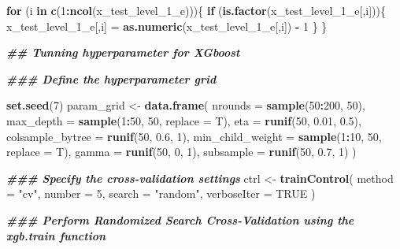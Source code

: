 \documentclass[11pt,]{article}
\newenvironment{Shaded}{\begin{snugshade}}{\end{snugshade}}
\newcommand{\AttributeTok}[1]{\textcolor[rgb]{0.13,0.29,0.53}{#1}}
\newcommand{\ConstantTok}[1]{\textcolor[rgb]{0.56,0.35,0.01}{#1}}
\newcommand{\ControlFlowTok}[1]{\textcolor[rgb]{0.13,0.29,0.53}{\textbf{#1}}}
\newcommand{\DecValTok}[1]{\textcolor[rgb]{0.00,0.00,0.81}{#1}}
\newcommand{\DocumentationTok}[1]{\textcolor[rgb]{0.56,0.35,0.01}{\textbf{\textit{#1}}}}
\newcommand{\FloatTok}[1]{\textcolor[rgb]{0.00,0.00,0.81}{#1}}
\newcommand{\FunctionTok}[1]{\textcolor[rgb]{0.13,0.29,0.53}{\textbf{#1}}}
\newcommand{\NormalTok}[1]{#1}
\newcommand{\OtherTok}[1]{\textcolor[rgb]{0.56,0.35,0.01}{#1}}
\newcommand{\SpecialCharTok}[1]{\textcolor[rgb]{0.81,0.36,0.00}{\textbf{#1}}}
\newcommand{\StringTok}[1]{\textcolor[rgb]{0.31,0.60,0.02}{#1}}
\begin{document}
\begin{Shaded}
\begin{Highlighting}[]
\ControlFlowTok{for}\NormalTok{ (i }\ControlFlowTok{in} \FunctionTok{c}\NormalTok{(}\DecValTok{1}\SpecialCharTok{:}\FunctionTok{ncol}\NormalTok{(x\_test\_level\_1\_e)))\{}
  \ControlFlowTok{if}\NormalTok{ (}\FunctionTok{is.factor}\NormalTok{(x\_test\_level\_1\_e[,i]))\{}
\NormalTok{    x\_test\_level\_1\_e[,i] }\OtherTok{=} \FunctionTok{as.numeric}\NormalTok{(x\_test\_level\_1\_e[,i]) }\SpecialCharTok{{-}} \DecValTok{1}
\NormalTok{  \}}
\NormalTok{\}}

\DocumentationTok{\#\# Tunning hyperparameter for XGboost}

\DocumentationTok{\#\#\# Define the hyperparameter grid}

\FunctionTok{set.seed}\NormalTok{(}\DecValTok{7}\NormalTok{)}
\NormalTok{param\_grid }\OtherTok{\textless{}{-}} \FunctionTok{data.frame}\NormalTok{(}
  \AttributeTok{nrounds =} \FunctionTok{sample}\NormalTok{(}\DecValTok{50}\SpecialCharTok{:}\DecValTok{200}\NormalTok{, }\DecValTok{50}\NormalTok{),                   }
  \AttributeTok{max\_depth =} \FunctionTok{sample}\NormalTok{(}\DecValTok{1}\SpecialCharTok{:}\DecValTok{50}\NormalTok{, }\DecValTok{50}\NormalTok{, }\AttributeTok{replace =}\NormalTok{ T),                    }
  \AttributeTok{eta =} \FunctionTok{runif}\NormalTok{(}\DecValTok{50}\NormalTok{, }\FloatTok{0.01}\NormalTok{, }\FloatTok{0.5}\NormalTok{),                      }
  \AttributeTok{colsample\_bytree =} \FunctionTok{runif}\NormalTok{(}\DecValTok{50}\NormalTok{, }\FloatTok{0.6}\NormalTok{, }\DecValTok{1}\NormalTok{),}
  \AttributeTok{min\_child\_weight =} \FunctionTok{sample}\NormalTok{(}\DecValTok{1}\SpecialCharTok{:}\DecValTok{10}\NormalTok{, }\DecValTok{50}\NormalTok{, }\AttributeTok{replace =}\NormalTok{ T),}
  \AttributeTok{gamma =} \FunctionTok{runif}\NormalTok{(}\DecValTok{50}\NormalTok{, }\DecValTok{0}\NormalTok{, }\DecValTok{1}\NormalTok{),}
  \AttributeTok{subsample =} \FunctionTok{runif}\NormalTok{(}\DecValTok{50}\NormalTok{, }\FloatTok{0.7}\NormalTok{, }\DecValTok{1}\NormalTok{)}
\NormalTok{)}

\DocumentationTok{\#\#\# Specify the cross{-}validation settings}
\NormalTok{ctrl }\OtherTok{\textless{}{-}} \FunctionTok{trainControl}\NormalTok{(}
  \AttributeTok{method =} \StringTok{"cv"}\NormalTok{,              }
  \AttributeTok{number =} \DecValTok{5}\NormalTok{,                 }
  \AttributeTok{search =} \StringTok{"random"}\NormalTok{,          }
  \AttributeTok{verboseIter =} \ConstantTok{TRUE}          
\NormalTok{)}

\DocumentationTok{\#\#\# Perform Randomized Search Cross{-}Validation using the xgb.train function}


\end{Highlighting}
\end{Shaded}
\end{document}
